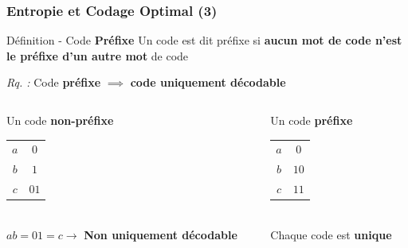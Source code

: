 \documentclass{beamer}
\begin{document}
\begin{frame}
    \frametitle{Entropie et Codage Optimal (3)}

    \begin{alertblock}{Définition - Code \bfseries Préfixe}
        Un code est dit préfixe si \textbf{aucun mot de code n'est le préfixe d'un autre mot} de code
    \end{alertblock}

    \textit{Rq. :} Code \textbf{préfixe} $\implies$ \textbf{code uniquement décodable}

    \vspace*{3em}

    \begin{columns}
        \begin{column}{0.5\textwidth}
            \centering 
            Un code \bfseries non-préfixe \\
            \begin{tabular}{c | c}
                \hline
                $a$ & $0$ \\
                $b$ & $1$ \\
                $c$ & $01$ \\ \hline
            \end{tabular} \\
        \vspace*{1em}
        $ab = 01 = c \rightarrow$ \textbf{\alert{Non} uniquement décodable}
        \end{column}

        \begin{column}{0.5\textwidth} %
            \centering
            Un code \textbf{préfixe} \\
            \begin{tabular}{c | c}
                \hline
                $a$ & $0$ \\
                $b$ & $10$ \\
                $c$ & $11$ \\ \hline
            \end{tabular} \\
            \vspace*{1em}
            Chaque code est \textbf{unique}
        \end{column}
    \end{columns}
\end{frame}
\end{document}
